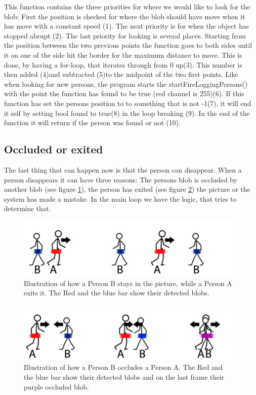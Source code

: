 This function contains the three priorities for where we would like to look for the blob: First the position is checked for where the blob should have move when it has move with a constant speed (1). The next priority is for when the object has stopped abrupt (2). The last priority for looking is several places. Starting from the position between the two previous points the function goes to both sides until it on one of the side hit the border for the maximum distance to move. This is done, by having a for-loop, that iterates through from 0 up(3). This number is then added (4)and subtracted (5)to the midpoint of the two first points. Like when looking for new persons, the program starts the startFireLoggingPersons() with the point the function has found to be true (red channel is 255)(6). If this function has set the persons position to to something that is not -1(7), it will end it self by setting bool found to true(8) in the loop breaking (9). In the end of the function it will return if the person was found or not (10).
\subsection{Occluded or exited}
The last thing that can happen now is that the person can disappear. When a person disappears it can have three reasons: The persons blob is occluded by another blob (see figure \ref{fig:enterexit}), the person has exited (see figure \ref{fig:occlusion}) the picture or the system has made a mistake. In the main loop we have the logic, that tries to determine that. 

\begin{figure}[htbp]
\centering
\includegraphics[width=1.00\textwidth]{Pictures/Design/enterexit.jpg}
\caption{Illustration of how a Person B stays in the picture, while a Person A exits it. The Red and the blue bar show their detected blobs.}
\label{fig:enterexit}
\end{figure}

\begin{figure}[htbp]
\centering
\includegraphics[width=1.00\textwidth]{Pictures/Design/occluded.jpg}
\caption{Illustration of how a Person B occludes a Person A. The Red and the blue bar show their detected blobs and on the last frame their purple occluded blob.}
\label{fig:occlusion}
\end{figure}

